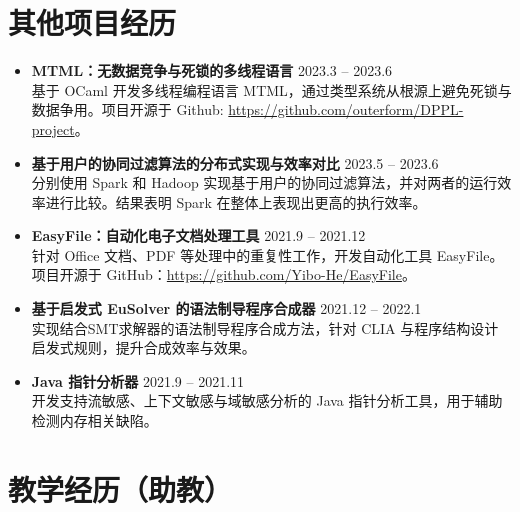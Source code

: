 \documentclass[letterpaper,11pt]{article}
\begin{document}
\section{其他项目经历}
\begin{itemize}[leftmargin=*]

    \item \textbf{MTML：无数据竞争与死锁的多线程语言} \hfill 2023.3 -- 2023.6 \vspace{0.2cm}\\
    {\small 基于 OCaml 开发多线程编程语言 MTML，通过类型系统从根源上避免死锁与数据争用。项目开源于 Github: \href{https://github.com/outerform/DPPL-project}{https://github.com/outerform/DPPL-project}。}

    \item \textbf{基于用户的协同过滤算法的分布式实现与效率对比} \hfill
    2023.5 -- 2023.6 \vspace{0.2cm}\\
    {\small 分别使用 Spark 和 Hadoop 实现基于用户的协同过滤算法，并对两者的运行效率进行比较。结果表明 Spark 在整体上表现出更高的执行效率。}

    \item \textbf{EasyFile：自动化电子文档处理工具} \hfill 2021.9 -- 2021.12 \vspace{0.2cm}\\
    {\small 针对 Office 文档、PDF 等处理中的重复性工作，开发自动化工具 EasyFile。项目开源于 GitHub：\href{https://github.com/Yibo-He/EasyFile}{https://github.com/Yibo-He/EasyFile}。}

    \item \textbf{基于启发式 EuSolver 的语法制导程序合成器} \hfill 2021.12 -- 2022.1 \vspace{0.2cm}\\
    {\small 实现结合SMT求解器的语法制导程序合成方法，针对 CLIA 与程序结构设计启发式规则，提升合成效率与效果。}

    \item \textbf{Java 指针分析器} \hfill 2021.9 -- 2021.11 \vspace{0.2cm}\\
    {\small 开发支持流敏感、上下文敏感与域敏感分析的 Java 指针分析工具，用于辅助检测内存相关缺陷。}

\end{itemize}

\section{教学经历（助教）}
\end{document}
